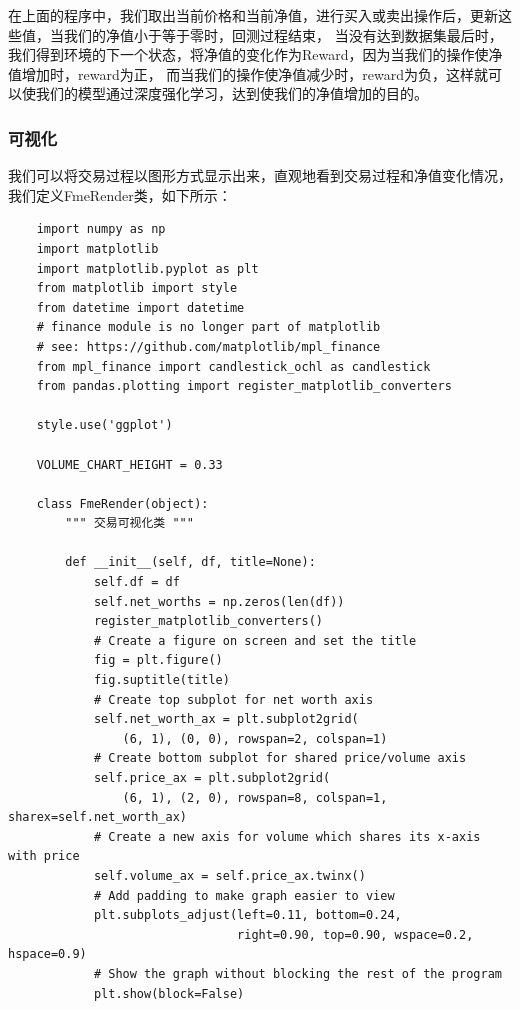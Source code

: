 \documentclass{article}
\begin{document}
在上面的程序中，我们取出当前价格和当前净值，进行买入或卖出操作后，更新这些值，当我们的净值小于等于零时，回测过程结束，
当没有达到数据集最后时，我们得到环境的下一个状态，将净值的变化作为Reward，因为当我们的操作使净值增加时，reward为正，
而当我们的操作使净值减少时，reward为负，这样就可以使我们的模型通过深度强化学习，达到使我们的净值增加的目的。

\subsubsection{可视化}
我们可以将交易过程以图形方式显示出来，直观地看到交易过程和净值变化情况，我们定义FmeRender类，如下所示：
\begin{lstlisting}
    import numpy as np
    import matplotlib
    import matplotlib.pyplot as plt
    from matplotlib import style
    from datetime import datetime
    # finance module is no longer part of matplotlib
    # see: https://github.com/matplotlib/mpl_finance
    from mpl_finance import candlestick_ochl as candlestick
    from pandas.plotting import register_matplotlib_converters
    
    style.use('ggplot')
    
    VOLUME_CHART_HEIGHT = 0.33
    
    class FmeRender(object):
        """ 交易可视化类 """
    
        def __init__(self, df, title=None):
            self.df = df
            self.net_worths = np.zeros(len(df))
            register_matplotlib_converters()
            # Create a figure on screen and set the title
            fig = plt.figure()
            fig.suptitle(title)
            # Create top subplot for net worth axis
            self.net_worth_ax = plt.subplot2grid(
                (6, 1), (0, 0), rowspan=2, colspan=1)
            # Create bottom subplot for shared price/volume axis
            self.price_ax = plt.subplot2grid(
                (6, 1), (2, 0), rowspan=8, colspan=1, sharex=self.net_worth_ax)
            # Create a new axis for volume which shares its x-axis with price
            self.volume_ax = self.price_ax.twinx()
            # Add padding to make graph easier to view
            plt.subplots_adjust(left=0.11, bottom=0.24,
                                right=0.90, top=0.90, wspace=0.2, hspace=0.9)
            # Show the graph without blocking the rest of the program
            plt.show(block=False)
    

\end{lstlisting}
\end{document}
